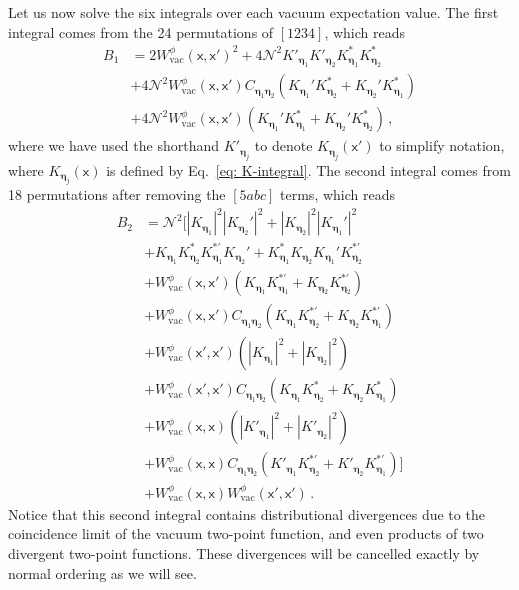 \documentclass[11pt,prd,onecolumn,superscriptaddress,nofootinbib,floatfix,amsmath,amssymb]{revtex4-2}
\newcommand{\sx}{\mathsf{x}}
\newcommand{\spec}{C_{\ba\bb}}
\newcommand{\NN}{\mathcal{N}}
\newcommand{\rr}[1]{\left(#1\right)}
\newcommand{\ba}{{\bm{\eta}_1}}
\newcommand{\bb}{{\bm{\eta}_2}}
\newcommand{\norm}[1]{||#1||}
\newcommand{\tcb}[1]{\leavevmode{\color{blue}{#1}}}
\newcommand{\vac}{\text{vac}}
\newcommand{\bc}{{\bm{\eta}}}
\begin{document}
    Let us now solve the six integrals over each vacuum expectation value. The first integral comes from the 24 permutations of $[1234]$, which reads
    \begin{equation}
    \begin{split}
        B_1 &= 2W^\phi_{\vac}(\sx,\sx')^2%
        + 4{\NN}^2K'_\ba K'_\bb K^*_\ba K^*_\bb  \\
        &+ 4{\NN}^2W_{\vac}^\phi(\sx,\sx')\spec\rr{K_\ba'K^*_\bb +K_\bb'K^*_\ba } \\
        &+ 4{\NN}^2W_{\vac}^\phi(\sx,\sx')\rr{K_\ba'K^*_\ba +K_\bb'K^*_\bb }\,,
    \end{split}
    \end{equation}
    where we have used the shorthand $K'_{\bc_j}$ to denote $K_{\bc_j}(\sx')$ to simplify notation, where $K_{\bc_j}(\sx)$ is defined by Eq.~\eqref{eq: K-integral}.
    The second integral comes from 18 permutations after removing the $[5abc]$ terms, which reads
    \begin{equation}
        \begin{split}
        B_2 &= {\NN}^2\bigg[|K_\ba|^2|K_\bb'|^2 + |K_\bb|^2|K_\ba'|^2  \\
        &+
        K_\ba K_\bb^*K_\ba^{*'} K_\bb' +  K_\ba^* K_\bb K_\ba' K_\bb^{*'} \\
        &+
        W_{\vac}^\phi(\sx,\sx')\rr{K_\ba {K}^{*'}_\ba + K_\bb {K}^{*'}_\bb } \\
        &+
        W_{\vac}^\phi(\sx,\sx')\spec\rr{K_\ba {K}^{*'}_\bb + K_\bb {K}^{*'}_\ba }  \\
        &+
        W_{\vac}^\phi(\sx',\sx')\rr{|K_\ba|^2 + |K_\bb|^2 }  \\
        &+
        W_{\vac}^\phi(\sx',\sx')\spec\rr{K_\ba K^*_\bb + K_\bb K^{*}_\ba }  \\
        &+
        W_{\vac}^\phi(\sx,\sx)\rr{|K'_\ba|^2 + |K'_\bb|^2 }  \\
        &+
        W_{\vac}^\phi(\sx,\sx)\spec\rr{K'_\ba {K}^{*'}_\bb + K'_\bb {K}^{*'}_\ba } \bigg]\\
        &+
        W_{\vac}^\phi(\sx,\sx)W_{\vac}^\phi(\sx',\sx')\,.%
        \end{split}
    \end{equation}
    Notice that this second integral contains distributional divergences due to the coincidence limit of the vacuum two-point function, and even products of two divergent two-point functions. These divergences will be cancelled exactly by normal ordering as we will see. 
    
\end{document}
